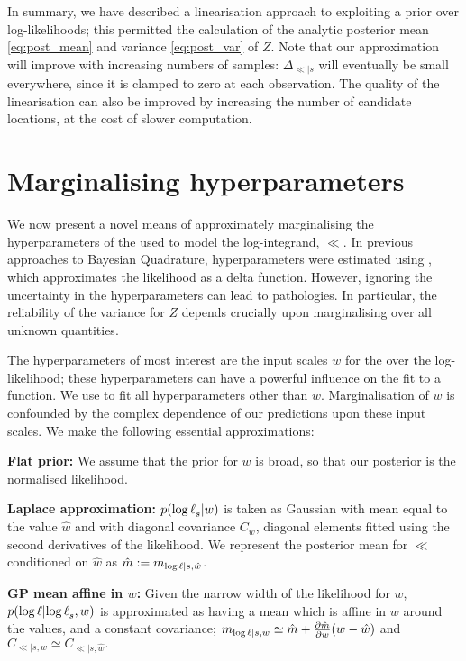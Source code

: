 \documentclass{article} %
\newcommand{\De}{\Delta_{\ll|s}}
\begin{document}
In summary, we have described a linearisation approach to exploiting a  prior over log-likelihoods; this permitted the calculation of the analytic posterior mean \eqref{eq:post_mean} and variance \eqref{eq:post_var} of $Z$. Note that our approximation will improve with increasing numbers of samples: $\De$ will
eventually be small everywhere, since it is clamped to zero at each observation. 
The quality of the linearisation can also be improved by increasing the number of candidate locations, at the cost of slower computation.

\section{Marginalising hyperparameters}
\label{sec:marginalising}

We now present a novel means of approximately marginalising the hyperparameters of the \gpb used to model the log-integrand, $\ll$. In previous approaches to Bayesian Quadrature, hyperparameters were estimated using
 , which approximates the likelihood as a delta function. However, ignoring the uncertainty in the hyperparameters can lead to pathologies. In particular, the reliability of the variance for $Z$ depends crucially upon marginalising over all unknown quantities. 

The hyperparameters of most interest are the input scales $w$ for the \gpb over the log-likelihood; these hyperparameters can have a powerful influence on the fit to a function. We use  to fit all hyperparameters other than $w$. Marginalisation of $w$ is confounded by the complex dependence of our predictions upon these input scales. 
We make the following essential approximations:

{\bf Flat prior:} We assume that the prior for $w$ is broad, so that our posterior is the normalised likelihood.

{\bf Laplace approximation:} $\p{\ll_s}{w}$ is taken as Gaussian with mean equal to the  value $\hat{w}$ and with diagonal covariance $C_w$, diagonal elements fitted using the second derivatives of the likelihood. We represent the posterior mean for $\ll$ conditioned on $\hat{w}$ as $\hat{m} \deq m_{\ll|s,\hat{w}}$.

{\bf GP mean affine in $w$:} Given the narrow width of the likelihood for $w$, $\p{\ll}{\ll_s, w}$ is approximated as having a \gpb mean which is affine in $w$ around the  values, and a constant covariance;
$m_{\ll|s,w} \simeq \hat{m}
 + \pderiv{\hat{m} }{w} (w- \hat{w})$
and
$
C_{\ll|s, w} \simeq C_{\ll|s, \hat{w}}.
$
 
\end{document}
